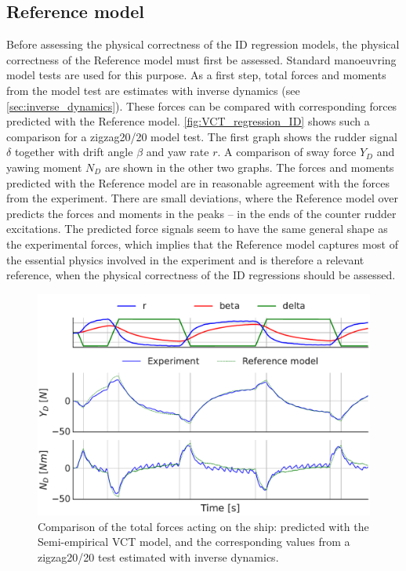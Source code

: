 \subsection{Reference model}
\label{sec:result_VCT_regression}
Before assessing the physical correctness of the ID regression models, the physical correctness of the Reference model must first be assessed. Standard manoeuvring model tests are used for this purpose. As a first step, total forces and moments from the model test are estimates with inverse dynamics (see \autoref{sec:inverse_dynamics}). These forces can be compared with corresponding forces predicted with the Reference model. 
\autoref{fig:VCT_regression_ID} shows such a comparison for a zigzag20/20 model test. The first graph shows the rudder signal $\delta$ together with drift angle $\beta$ and yaw rate $r$. A comparison of sway force $Y_D$ and yawing moment $N_D$ are shown in the other two graphs. The forces and moments predicted with the Reference model are in reasonable agreement with the forces from the experiment. There are small deviations, where the Reference model over predicts the forces and moments in the peaks -- in the ends of the counter rudder excitations. The predicted force signals seem to have the same general shape as the experimental forces, which implies that the Reference model captures most of the essential physics involved in the experiment and is therefore a relevant reference, when the physical correctness of the ID regressions should be assessed. 
\begin{figure}[h!]
    \includegraphics[width=\columnwidth]{figures/result_VCT_regression.VCT_regression_ID.pdf}
    \caption{Comparison of the total forces acting on the ship: predicted with the Semi-empirical VCT model, and the corresponding values from a zigzag20/20 test estimated with inverse dynamics.}
    \label{fig:VCT_regression_ID}
\end{figure}


